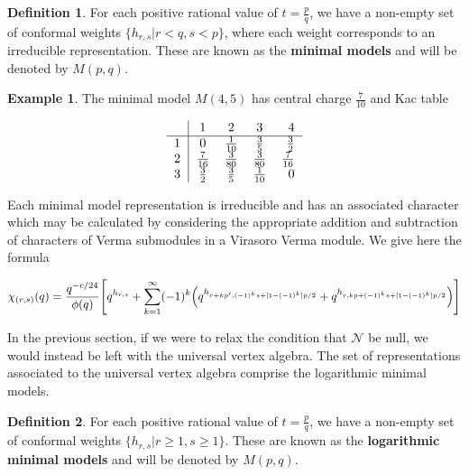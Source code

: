\documentclass[a4paper,reqno,12pt]{report}
\theoremstyle{definition}
\newtheorem{exmp}{Example}[section]
\newtheorem{defn}{Definition}[section]
\numberwithin{equation}{section}
\let\originalleft\left     %
\let\originalright\right
\renewcommand{\left}{\mathopen{}\mathclose\bgroup\originalleft}
\renewcommand{\right}{\aftergroup\egroup\originalright}
\renewcommand{\ge}{\geqslant}
\theoremstyle{plain}
\begin{document}
\begin{defn}
For each positive rational value of $t=\frac{p}{q}$, we have a non-empty set of conformal weights $\{h_{r,s}| r<q , s<p\}$, where each weight corresponds to an irreducible representation. These are known as the {\bf minimal models} and will be denoted by $M(p,q)$.
\end{defn}

 \begin{exmp}
 The minimal model $M(4,5)$ has central charge $\frac{7}{10}$ and Kac table

\begin{table}[H]\label{tab:M45Kac}
\doublespacing
\[
\begin{tabular}{ >{$}l<{$} | >{$}c<{$} >{$}c<{$}  >{$}c<{$}  >{$}r<{$} }
   & 1 & 2 & 3 & 4 \\ \hline
  1 & 0 & \tfrac{1}{10} & \tfrac{3}{5} & \tfrac{3}{2} \\
  2 & \tfrac{7}{16} & \tfrac{3}{80} & \tfrac{3}{80} & \tfrac{7}{16} \\
  3 & \tfrac{3}{2} & \tfrac{3}{5} & \tfrac{1}{10} & 0 \\
\end{tabular}
\]
\end{table}

\end{exmp}

Each minimal model representation is irreducible and has an associated character which may be calculated by considering the appropriate addition and subtraction of characters of Verma submodules in a Virasoro Verma module. We give here the formula \cite{MatCFT97}

\begin{align*}
\chi_{(r,s)}(q) = \frac{q^{-c/24}}{\phi(q)}\left[q^{h_{r,s}} + \sum_{k=1}^{\infty}(-1)^k\left(q^{h_{r+kp',(-1)^k s+[1-(-1)^k]p/2}}+q^{h_{r,kp+(-1)^ks+[1-(-1)^k]p/2}}\right)\right]
\end{align*}

In the previous section, if we were to relax the condition that $\mathcal{N}$ be null, we would instead be left with the universal vertex algebra. The set of representations associated to the universal vertex algebra comprise the logarithmic minimal models.

\begin{defn}
For each positive rational value of $t=\frac{p}{q}$, we have a non-empty set of conformal weights $\{h_{r,s}| r\ge 1 , s\ge 1\}$. These are known as the {\bf logarithmic minimal models} and will be denoted by $M(p,q)$.
\end{defn}
\end{document}
